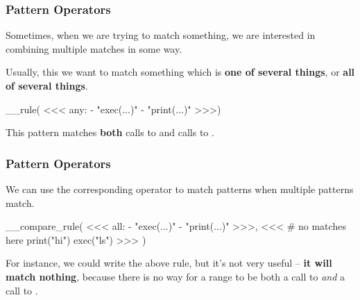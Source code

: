 \documentclass[aspectratio=169, handout]{beamer}
\begin{document}
\begin{frame}[fragile]
  \frametitle{Pattern Operators}

  Sometimes, when we are trying to match something, we are interested in combining
  multiple matches in some way.

  \vspace{\fill}

  Usually, this we want to match something which is \textbf{one of
  several things}, or \textbf{all of several things}.

  \vspace{\fill}


  \vspace{\fill}

__rule(
<<<
    any:
      - "exec(...)"
      - "print(...)"
>>>)

  \vspace{\fill}

  This pattern matches \textbf{both} calls to  and calls to .
\end{frame}

\begin{frame}[fragile]
  \frametitle{Pattern Operators}

  We can use the corresponding  operator to match patterns when multiple
  patterns match.

  \vspace{\fill}

__compare_rule(
<<<
  all:
    - "exec(...)"
    - "print(...)"
>>>,
<<<
  # no matches here
  print("hi")
  exec("ls")
>>>
)

  \vspace{\fill}

  For instance, we could write the above rule, but it's not very useful -- \textbf{it will
  match nothing}, because there is no way for a range to be both a call to
   \textit{and} a call to .
\end{frame}
\end{document}
